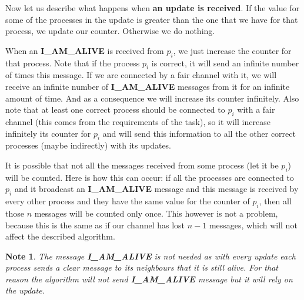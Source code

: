 \documentclass[12pt]{article}
\theoremstyle{plain}
\begin{document}
\begin{itemize}
    Now let us describe what happens when \textbf{an update is received}. If the
    value for some of the processes in the update is greater than the one that
    we have for that process, we update our counter. Otherwise we do nothing.

    When an \textbf{I\_AM\_ALIVE} is received from $p_i$, we just increase the
    counter for that process. Note that if the process $p_i$ is correct, 
    it will send an infinite number of times this message. If we are connected
    by a fair channel with it, we will receive an infinite number of
    \textbf{I\_AM\_ALIVE} messages from it for an infinite amount of time.
    And as a consequence we will increase its counter infinitely. Also note that
    at least one correct process should be connected to $p_i$ with a fair
    channel (this comes from the requirements of the task), so it will increase
    infinitely its counter for $p_i$ and will send this information to all the
    other correct processes (maybe indirectly) with its updates.

    It is possible that not all the messages received from some process (let it
    be $p_i$) will be counted. Here is how this can occur: if all the processes
    are connected to $p_i$ and it broadcast an \textbf{I\_AM\_ALIVE} message
    and this message is received by every other process and they have the same
    value for the counter of $p_i$, then all those $n$ messages will be counted
    only once. This however is not a problem, because this is the same as if
    our channel has lost $n - 1$ messages, which will not affect the described
    algorithm.
\end{itemize}

\newtheorem*{note2}{Note}
\begin{note2}
  The message \textbf{I\_AM\_ALIVE} is not needed as with every update each
  process sends a clear message to its neighbours that it is still alive. For
  that reason the algorithm will not send \textbf{I\_AM\_ALIVE} message but
  it will rely on the update.
\end{note2}
\end{document}
